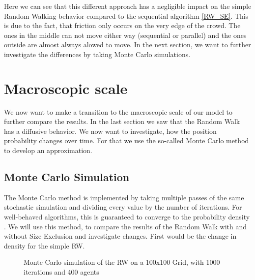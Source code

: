 Here we can see that this different approach has a negligible impact on the simple Random Walking behavior compared to the sequential algorithm \ref{RW_SE}. 
This is due to the fact, that friction only occurs on the very edge of the crowd. 
The ones in the middle can not move either way (sequential or parallel) and the ones outside are almost always alowed to move. 
In the next section, we want to further investigate the differences by taking Monte Carlo simulations. 

\newpage

\section{Macroscopic scale}
We now want to make a transition to the macroscopic scale of our model to further compare the results.
In the last section we saw that the Random Walk has a diffusive behavior. 
We now want to investigate, how the position probability changes over time.
For that we use the so-called Monte Carlo method to develop an approximation. 

\subsection{Monte Carlo Simulation}
The Monte Carlo method is implemented by taking multiple passes of the same stochastic simulation and dividing every value by the number of iterations.
For well-behaved algorithms, this is guaranteed to converge to the probability density \autocite{harrison2010introduction}.
We will use this method, to compare the results of the Random Walk with and without Size Exclusion
and investigate changes. 
First would be the change in density for the simple RW.
\begin{figure}[h]
   \label{fig:fig7}
   \begin{center}
       
   \end{center}
   \caption{Monte Carlo simulation of the RW on a 100x100 Grid, with 1000 iterations and 400 agents}
\end{figure}

